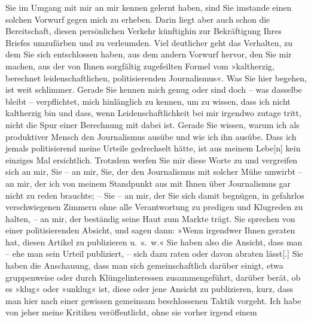 \begin{ledgroupsized}[t]{13cm}
               Sie im Umgang mit mir an mir kennen gelernt haben, sind Sie imstande einen solchen
               Vorwurf gegen mich zu erheben. Darin liegt aber auch schon die Bereitschaft, diesen
               persönlichen Verkehr künftighin zur Bekräftigung Ihres Briefes umzufärben und zu
               verleumden.\pend
           \pstart
           Viel deutlicher geht das Verhalten, zu dem Sie sich entschlossen haben, aus dem
               andern Vorwurf hervor, den Sie mir machen, aus der von Ihnen sorgfältig zugefeilten
               Formel vom »kaltherzig, berechnet leidenschaftlichen, politisierenden Journalismus«.
               Was Sie hier begehen, ist weit schlimmer. Gerade Sie kennen mich genug oder sind doch
               – was dasselbe bleibt – verpflichtet, mich hinlänglich zu kennen, um zu wissen, dass
               ich nicht kaltherzig bin und dass, wenn Leidenschaftlichkeit bei mir irgendwo zutage
               tritt, nicht die Spur einer Berechnung mit dabei ist. Gerade Sie wissen, warum ich
               als produktiver Mensch den Journalismus ausübe und wie ich ihn ausübe. Dass ich
               jemals politisierend meine Urteile gedrechselt hätte, ist aus meinem
                  Lebe{[}n{]} kein einziges Mal ersichtlich. Trotzdem werfen Sie mir
               diese Worte zu und vergreifen sich an mir, Sie – an mir, Sie, der den Journalismus
               mit solcher Mühe umwirbt – an mir, der ich von meinem Standpunkt aus mit Ihnen über
               Journalismus gar nicht zu reden brauchte; – Sie – an mir, der Sie sich damit
               begnügen, in gefahrlos verschwiegenen Zimmern ohne alle Verantwortung zu pre{\pb}digen und Klugreden zu halten, –
               an mir, der beständig seine Haut zum Markte trägt.\pend
           \pstart
           Sie sprechen von einer politisierenden Absicht, und sagen dann: »Wenn irgendwer Ihnen
               geraten hat, diesen Artikel zu publizieren u. s. w.« Sie haben also die Ansicht, dass
               man – ehe man sein Urteil publiziert, – sich dazu raten oder davon abraten
                  lässt{[}.{]} Sie haben die Anschauung, dass man sich
               gemeinschaftlich darüber einigt, etwa gruppenweise oder durch Klüngelinteressen
               zusammengeführt, darüber berät, ob es »klug« oder »unklug« ist, diese oder jene
               Ansicht zu publizieren, kurz, dass man hier nach einer gewissen gemeinsam
               beschlossenen Taktik vorgeht.\pend
           \pstart
           Ich habe von jeher meine Kritiken veröffentlicht, ohne sie vorher irgend einem

\end{ledgroupsized}
